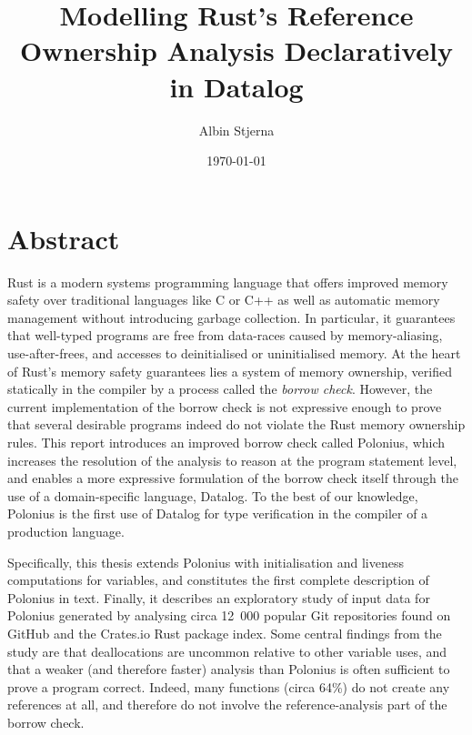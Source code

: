 \documentclass[11pt,a4paper,twoside,openany,draft]{report}
\author{Albin Stjerna}
\date{\today}
\title{Modelling Rust's Reference Ownership Analysis Declaratively in Datalog}
\begin{document}


\maketitle

\section*{Abstract}

Rust is a modern systems programming language that offers improved memory safety
over traditional languages like C or C++ as well as automatic memory management
without introducing garbage collection. In particular, it guarantees that
well-typed programs are free from data-races caused by memory-aliasing,
use-after-frees, and accesses to deinitialised or uninitialised memory. At the
heart of Rust's memory safety guarantees lies a system of memory ownership,
verified statically in the compiler by a process called the \textit{borrow
  check}. However, the current implementation of the borrow check is not
expressive enough to prove that several desirable programs indeed do not violate
the Rust memory ownership rules. This report introduces an improved borrow check
called Polonius, which increases the resolution of the analysis to reason at the
program statement level, and enables a more expressive formulation of the borrow
check itself through the use of a domain-specific language, Datalog. To the best
of our knowledge, Polonius is the first use of Datalog for type verification in
the compiler of a production language.

Specifically, this thesis extends Polonius with initialisation and liveness
computations for variables, and constitutes the first complete description of
Polonius in text. Finally, it describes an exploratory study of input
data for Polonius generated by analysing circa 12~000 popular Git repositories
found on GitHub and the Crates.io Rust package index. Some central findings from
the study are that deallocations are uncommon relative to other variable uses,
and that a weaker (and therefore faster) analysis than Polonius is often
sufficient to prove a program correct. Indeed, many functions (circa 64\%) do
not create any references at all, and therefore do not involve the
reference-analysis part of the borrow check.
\end{document}
